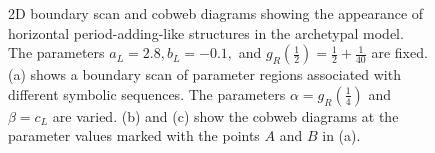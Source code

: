 \begin{figure}
	\centering
	\caption[2D boundary scan and cobweb diagrams showing the appearance of horizontal period-adding-like structures in the archetypal model]{
		2D boundary scan and cobweb diagrams showing the appearance of horizontal period-adding-like structures in the archetypal model.
		The parameters $a_L = 2.8, b_L = -0.1,$ and $g_R\left(\frac{1}{2}\right) = \frac{1}{2} + \frac{1}{40}$ are fixed.
		(a) shows a boundary scan of parameter regions associated with different symbolic sequences.
		The parameters $\alpha = g_R\left(\frac{1}{4}\right)$ and $\beta = c_L$ are varied.
		(b) and (c) show the cobweb diagrams at the parameter values marked with the points $A$ and $B$ in (a).
	}
\end{figure}

